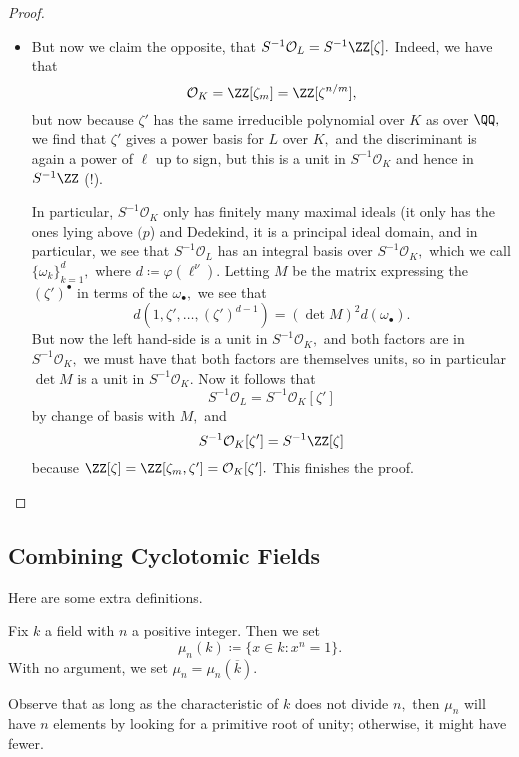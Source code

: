 \documentclass[../notes.tex]{subfiles}
\begin{document}
\begin{proof}
\begin{itemize}
		\item But now we claim the opposite, that $S^{-1}\mathcal O_L=S^{-1}\ZZ[\zeta].$ Indeed, we have that
		\[\mathcal O_K=\ZZ[\zeta_m]=\ZZ[\zeta^{n/m}],\]
		but now because $\zeta'$ has the same irreducible polynomial over $K$ as over $\QQ,$ we find that $\zeta'$ gives a power basis for $L$ over $K,$ and the discriminant is again a power of $\ell$ up to sign, but this is a unit in $S^{-1}\mathcal O_K$ and hence in $S^{-1}\ZZ$ (!).
		
		In particular, $S^{-1}\mathcal O_K$ only has finitely many maximal ideals (it only has the ones lying above $(p$) and Dedekind, it is a principal ideal domain, and in particular, we see that $S^{-1}\mathcal O_L$ has an integral basis over $S^{-1}\mathcal O_K,$ which we call $\{\omega_k\}_{k=1}^d,$ where $d\coloneqq \varphi\left(\ell^\nu\right).$ Letting $M$ be the matrix expressing the $(\zeta')^\bullet$ in terms of the $\omega_\bullet,$ we see that
		\[d(1,\zeta',\ldots,(\zeta')^{d-1})=(\det M)^2d(\omega_\bullet).\]
		But now the left hand-side is a unit in $S^{-1}\mathcal O_K,$ and both factors are in $S^{-1}\mathcal O_K,$ we must have that both factors are themselves units, so in particular $\det M$ is a unit in $S^{-1}\mathcal O_K.$ Now it follows that
		\[S^{-1}\mathcal O_L=S^{-1}\mathcal O_K[\zeta']\]
		by change of basis with $M,$ and
		\[S^{-1}\mathcal O_K[\zeta']=S^{-1}\ZZ[\zeta]\]
		because $\ZZ[\zeta]=\ZZ[\zeta_m,\zeta']=\mathcal O_K[\zeta'].$ This finishes the proof.
		\qedhere
	\end{itemize}
\end{proof}

\subsection{Combining Cyclotomic Fields}
Here are some extra definitions.
\begin{definition}
	Fix $k$ a field with $n$ a positive integer. Then we set
	\[\mu_n(k)\coloneqq \{x\in k:x^n=1\}.\]
	With no argument, we set $\mu_n=\mu_n(\overline k).$
\end{definition}
Observe that as long as the characteristic of $k$ does not divide $n,$ then $\mu_n$ will have $n$ elements by looking for a primitive root of unity; otherwise, it might have fewer.
\end{document}
